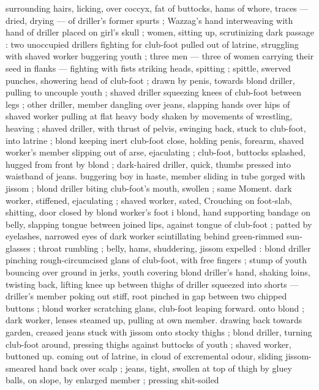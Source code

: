 surrounding hairs, licking, over coccyx, fat of buttocks, hams of 
whore, traces --- dried, drying --- of driller's former spurts ; 
Wazzag's hand interweaving with hand of driller placed on girl's skull 
; women, sitting up, scrutinizing dark passage : two unoccupied 
drillers fighting for club-foot pulled out of latrine, struggling with 
shaved worker buggering youth ; three men --- three of women 
carrying their seed in flanks --- fighting with fists striking heads, 
spitting ; spittle, swerved punches, showering head of club-foot ; 
drawn by penis, towards blond driller, pulling to uncouple youth ; 
shaved driller squeezing knees of club-foot between legs ; other 
driller, member dangling over jeans, slapping hands over hips of 
shaved worker pulling at flat heavy body shaken by movements of 
wrestling, heaving ; shaved driller, with thrust of pelvis, swinging 
back, stuck to club-foot, into latrine ; blond keeping inert club-foot 
close, holding penis, forearm, shaved worker's member slipping out 
of arse, ejaculating ; club-foot, buttocks splashed, hugged from front 
by blond ; dark-haired driller, quick, thumbs pressed into waistband 
of jeans. buggering boy in haste, member sliding in tube gorged with 
jissom ; blond driller biting club-foot's mouth, swollen ; same 
Moment. dark worker, stiffened, ejaculating ; shaved worker, sated, 
Crouching on foot-slab, shitting, door closed by blond worker's foot 
i blond, hand supporting bandage on belly, slapping tongue between 
joined lips, against tongue of club-foot ; patted by eyelashes, 
narrowed eyes of dark worker scintillating behind green-rimmed sun- 
glasses ; throat rumbling ; belly, hams, shuddering, jissom expelled : 
blond driller pinching rough-circumcised glans of club-foot, with free 
fingers ; stump of youth bouncing over ground in jerks, youth 
covering blond driller's hand, shaking loins, twisting back, lifting 
knee up between thighs of driller squeezed into shorts --- driller's 
member poking out stiff, root pinched in gap between two chipped 
buttons ; blond worker scratching glans, club-foot leaping forward. 
onto blond ; dark worker, lenses steamed up, pulling at own member. 
drawing back towards garden, creased jeans stuck with jissom onto 
stocky thighs ; blond driller, turning club-foot around, pressing 
thighs against buttocks of youth ; shaved worker, buttoned up. 
coming out of latrine, in cloud of excremental odour, sliding jissom- 
smeared hand back over scalp ; jeans, tight, swollen at top of thigh 
by gluey balls, on slope, by enlarged member ; pressing shit-soiled 
